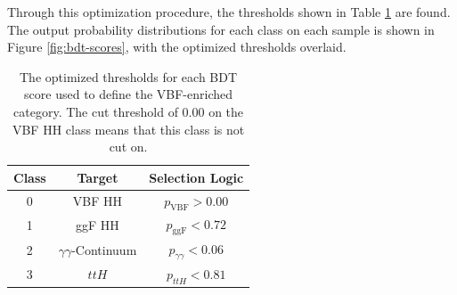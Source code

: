 Through this optimization procedure, the thresholds shown in Table \ref{tab:multiclass-thresholds} are found. The output probability distributions for each class on each sample is shown in Figure \ref{fig:bdt-scores}, with the optimized thresholds overlaid.

\begin{table}[!htb]
  \centering
  \caption[The optimized thresholds for each \gls{BDT} score used to define the VBF-enriched category]{The optimized thresholds for each \gls{BDT} score used to define the VBF-enriched category. The cut threshold of 0.00 on the VBF HH class means that this class is not cut on.}
  \begin{tabular}{c|c|c}
    \hline
    Class & Target & Selection Logic  \\
    \hline
    0 & VBF HH & $p_{\text{VBF}} > 0.00 $ \\
    1 & ggF HH & $p_{\text{ggF}} < 0.72 $ \\
    2 & $\gamma\gamma$-Continuum &  $p_{\gamma\gamma} < 0.06$ \\
    3 & $ttH$ &  $p_{ttH} < 0.81$ \\
    \hline
  \end{tabular}
  \label{tab:multiclass-thresholds}
\end{table}

